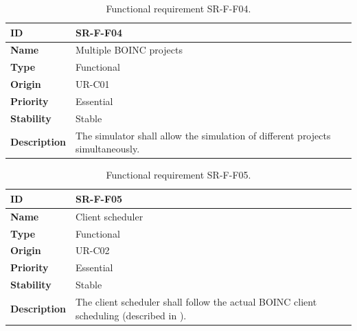 \begin{center}
\begin{table}[htbp]
\centering
\begin{tabular}{@{}p{2.5cm} p{9cm}@{}} 
\toprule
\textbf{ID} 				& SR-F-F04\\
\midrule
\textbf{Name} 			& Multiple BOINC projects \\
\midrule
\textbf{Type} 			& Functional \\
\midrule
\textbf{Origin} 			& UR-C01 \\
\midrule
\textbf{Priority}		& Essential \\
\midrule
\textbf{Stability} 		& Stable \\
\midrule
\textbf{Description} 	& The simulator shall allow the simulation of different projects simultaneously. \\
\bottomrule
\end{tabular}
\caption{Functional requirement SR-F-F04.}
\label{tab:srff04}
\end{table}
\end{center}

\begin{center}
\begin{table}[htbp]
\centering
\begin{tabular}{@{}p{2.5cm} p{9cm}@{}} 
\toprule
\textbf{ID} 				& SR-F-F05\\
\midrule
\textbf{Name} 			& Client scheduler \\
\midrule
\textbf{Type} 			& Functional \\
\midrule
\textbf{Origin} 			& UR-C02 \\
\midrule
\textbf{Priority}		& Essential \\
\midrule
\textbf{Stability} 		& Stable \\
\midrule
\textbf{Description} 	& The client scheduler shall follow the actual BOINC client \gls{scheduling} (described in \cite{anderson2007}). \\
\bottomrule
\end{tabular}
\caption{Functional requirement SR-F-F05.}
\label{tab:srff05}
\end{table}
\end{center}

